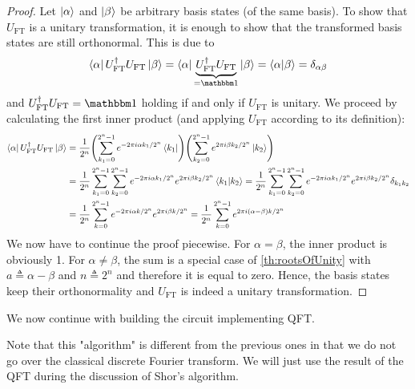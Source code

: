 		\begin{proof}
			Let \( \ket{\alpha} \) and \( \ket{\beta} \) be arbitrary basis states (of the same basis). To show that \(U_\mathrm{FT}\) is a unitary transformation, it is enough to show that the transformed basis states are still orthonormal. This is due to
			\begin{equation}
				\bra{\alpha} U_\mathrm{FT}^\dagger U_\mathrm{FT} \ket{\beta}
				= \bra{\alpha} \underbrace{U_\mathrm{FT}^\dagger U_\mathrm{FT}}_{= \ID} \ket{\beta}
				= \bra{\alpha} \ket{\beta}
				= \delta_{\alpha \beta}
			\end{equation}
			and \( U_\mathrm{FT}^\dagger U_\mathrm{FT} = \ID \) holding if and only if \(U_\mathrm{FT}\) is unitary. We proceed by calculating the first inner product (and applying \(U_\mathrm{FT}\) according to its definition):
			\begin{align}
				\bra{\alpha} U_\mathrm{FT}^\dagger U_\mathrm{FT} \ket{\beta}
				 & = \frac{1}{2^n} \Biggl( \sum_{k_1 = 0}^{2^n - 1} e^{-2 \pi i \alpha k_1 / 2^n} \bra{k_1} \Biggr) \Biggl( \sum_{k_2 = 0}^{2^n - 1} e^{2 \pi i \beta k_2 / 2^n} \ket{k_2} \Biggr) \\
				 & = \frac{1}{2^n} \sum_{k_1 = 0}^{2^n - 1} \sum_{k_2 = 0}^{2^n - 1} e^{-2 \pi i \alpha k_1 / 2^n} e^{2 \pi i \beta k_2 / 2^n} \ip{k_1}{k_2}
				= \frac{1}{2^n} \sum_{k_1 = 0}^{2^n - 1} \sum_{k_2 = 0}^{2^n - 1} e^{-2 \pi i \alpha k_1 / 2^n} e^{2 \pi i \beta k_2 / 2^n} \delta_{k_1 k_2}                                       \\
				 & = \frac{1}{2^n} \sum_{k = 0}^{2^n - 1} e^{-2 \pi i \alpha k / 2^n} e^{2 \pi i \beta k / 2^n}
				= \frac{1}{2^n} \sum_{k = 0}^{2^n - 1} e^{2 \pi i (\alpha - \beta) k / 2^n}
			\end{align}
			We now have to continue the proof piecewise. For \(\alpha = \beta\), the inner product is obviously \num{1}. For \(\alpha \neq \beta\), the sum is a special case of \autoref{th:rootsOfUnity} with \( a \triangleq \alpha - \beta \) and \( n \triangleq 2^n \) and therefore it is equal to zero. Hence, the basis states keep their orthonormality and \(U_\mathrm{FT}\) is indeed a unitary transformation.
		\end{proof}
		We now continue with building the circuit implementing \ac{QFT}.

		Note that this "algorithm" is different from the previous ones in that we do not go over the classical discrete Fourier transform. We will just use the result of the \ac{QFT} during the discussion of Shor's algorithm.

